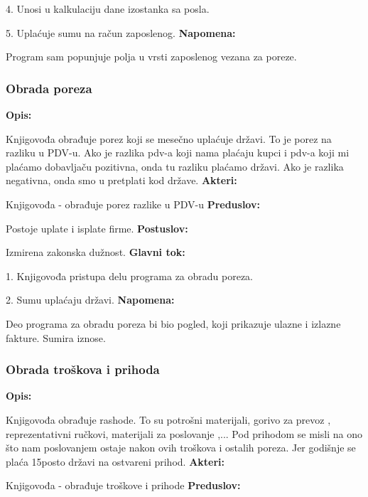 4. Unosi u kalkulaciju dane izostanka sa posla.

5. Uplaćuje sumu na račun zaposlenog.
\newline
\textbf{Napomena:}

Program sam popunjuje polja u vrsti zaposlenog vezana za poreze.

\subsubsection{Obrada poreza}

\textbf{Opis:}

Knjigovođa obrađuje porez koji se mesečno uplaćuje državi. To je porez na razliku u PDV-u. Ako je razlika pdv-a koji nama plaćaju kupci i pdv-a koji mi plaćamo dobavljaču pozitivna, onda tu razliku plaćamo državi. Ako je razlika negativna, onda smo u pretplati kod države.
\newline
\textbf{Akteri:}

Knjigovođa - obrađuje porez razlike u PDV-u
\newline
\textbf{Preduslov:}

Postoje uplate i isplate firme.
\newline
\textbf{Postuslov:}

Izmirena zakonska dužnost.
\newline
\textbf{Glavni tok:}

1. Knjigovođa pristupa delu programa za obradu poreza.

2. Sumu uplaćaju državi.
\newline
\textbf{Napomena:}

Deo programa za obradu poreza bi bio pogled, koji prikazuje ulazne i izlazne fakture. Sumira iznose.

\subsubsection{Obrada troškova i prihoda}

\textbf{Opis:}

Knjigovođa obrađuje rashode. To su potrošni materijali, gorivo za prevoz , reprezentativni ručkovi, materijali za poslovanje ,...
Pod prihodom se misli na ono što nam poslovanjem ostaje nakon ovih troškova i ostalih poreza. Jer godišnje se plaća 15posto državi na ostvareni prihod.
\newline
\textbf{Akteri:}

Knjigovođa - obrađuje troškove i prihode
\newline
\textbf{Preduslov:}

